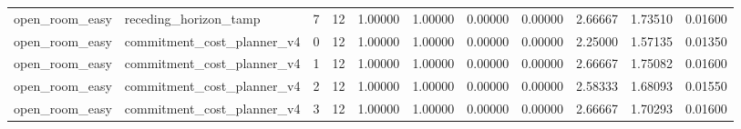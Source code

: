 \documentclass{article}
\begin{document}
\begin{table}[tbp]
{\begin{tabular}{lllllllllll}
open\_room\_easy & receding\_horizon\_tamp & 7 & 12 & 1.00000 & 1.00000 & 0.00000 & 0.00000 & 2.66667 & 1.73510 & 0.01600 \\
open\_room\_easy & commitment\_cost\_planner\_v4 & 0 & 12 & 1.00000 & 1.00000 & 0.00000 & 0.00000 & 2.25000 & 1.57135 & 0.01350 \\
open\_room\_easy & commitment\_cost\_planner\_v4 & 1 & 12 & 1.00000 & 1.00000 & 0.00000 & 0.00000 & 2.66667 & 1.75082 & 0.01600 \\
open\_room\_easy & commitment\_cost\_planner\_v4 & 2 & 12 & 1.00000 & 1.00000 & 0.00000 & 0.00000 & 2.58333 & 1.68093 & 0.01550 \\
open\_room\_easy & commitment\_cost\_planner\_v4 & 3 & 12 & 1.00000 & 1.00000 & 0.00000 & 0.00000 & 2.66667 & 1.70293 & 0.01600 \\
\bottomrule
\end{tabular}
}
\end{table}

\clearpage
\end{document}
